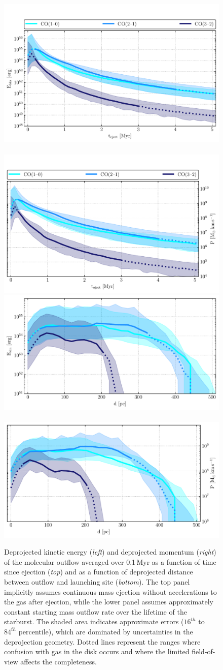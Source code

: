 \begin{figure}
    \centering
    \includegraphics[width=0.48\linewidth]{images/chapters/papers/outflow/outflow_fig9a.pdf}~~
    \includegraphics[width=0.48\linewidth]{images/chapters/papers/outflow/outflow_fig9b.pdf}
    \\
    \includegraphics[width=0.48\linewidth]{images/chapters/papers/outflow/outflow_fig9c.pdf}~~
    \includegraphics[width=0.48\linewidth]{images/chapters/papers/outflow/outflow_fig9d.pdf}
    \caption[Kinetic energy and momentum]{Deprojected kinetic energy (\emph{left}) and deprojected momentum (\emph{right}) of the molecular outflow averaged over 0.1\,Myr as a function of time since ejection (\emph{top}) and as a function of deprojected distance between outflow and launching site (\emph{bottom}). The top panel implicitly assumes continuous mass ejection without accelerations to the gas after ejection,  while the lower panel assumes approximately constant starting mass outflow rate over the lifetime of the starburst. The shaded area indicates approximate errors ($16^{th}$ to $84^{th}$ percentile), which are dominated by uncertainties in the deprojection geometry. Dotted lines represent the ranges where confusion with gas in the disk occurs and where the limited field-of-view affects the completeness.}
    \label{outflow: figure: outflow energy momentum}
\end{figure}

